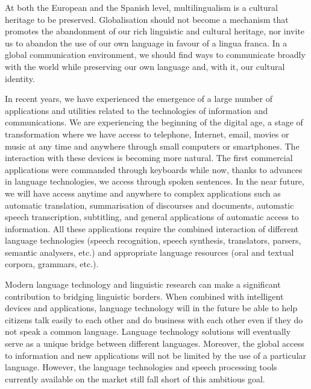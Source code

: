 \begin{multicols}{2}

At both the European and the Spanish level, multilingualism is a cultural heritage to be preserved. Globalisation should not become a mechanism that promotes the abandonment of our rich linguistic and cultural heritage, nor invite us to abandon the use of our own language in favour of a lingua franca. In a global communication environment, we should find ways to communicate broadly with the world while preserving our own language and, with it, our cultural identity.

In recent years, we have experienced the emergence of a large number of applications and utilities related to the technologies of information and communications. We are experiencing the beginning of the digital age, a stage of transformation where we have access to telephone, Internet, email, movies or music at any time and anywhere through small computers or smartphones. The interaction with these devices is becoming more natural. The first commercial applications were commanded through keyboards while now, thanks to advances in language technologies, we access through spoken sentences. In the near future, we will have access anytime and anywhere to complex applications such as automatic translation, summarisation of discourses and documents, automatic speech transcription, subtitling, and general applications of automatic access to information. All these applications require the combined interaction of different language technologies (speech recognition, speech synthesis, translators, parsers, semantic analysers, etc.) and appropriate language resources (oral and textual corpora, grammars, etc.).


Modern language technology and linguistic research can make a significant contribution to bridging linguistic borders. When combined with intelligent devices and applications, language technology will in the future be able to help citizens talk easily to each other and do business with each other even if they do not speak a common language. Language technology solutions will eventually serve as a unique bridge between different languages. Moreover, the global access to information and new applications will not be limited by the use of a particular language. However, the language technologies and speech processing tools currently available on the market still fall short of this ambitious goal. 


\end{multicols}
